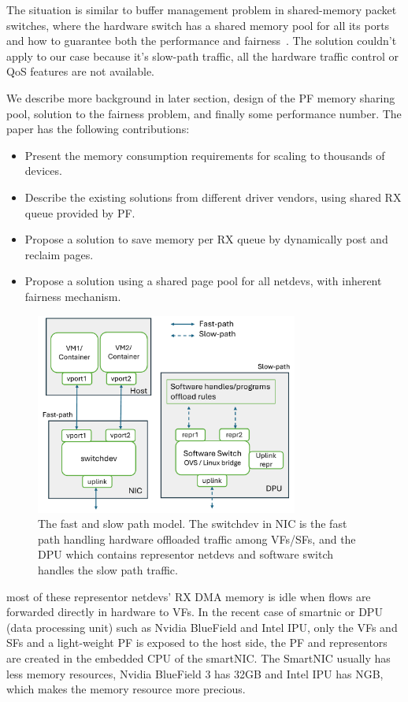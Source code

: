 \documentclass[letterpaper]{article}
\begin{document}
The situation is similar to buffer management problem in shared-memory
packet switches, where the hardware switch has a shared memory pool
for all its ports and how to guarantee both the performance and
fairness~\cite{devlinksb, queuelength}. The solution couldn't apply to
our case because it's slow-path traffic, all the hardware traffic
control or QoS features are not available.

We describe more background in later section, design of the PF memory
sharing pool, solution to the fairness problem, and finally some performance
number. The paper has the following contributions:
\begin{itemize}
    \item Present the memory consumption requirements for scaling to
          thousands of devices.
    \item Describe the existing solutions from different driver vendors,
          using shared RX queue provided by PF.
    \item Propose a solution to save memory per RX queue by dynamically
          post and reclaim pages.
    \item Propose a solution using a shared page pool for all netdevs,
          with inherent fairness mechanism.
\end{itemize}

\begin{figure}[h]
\includegraphics[width=3.4in]{arch.pdf}
\caption{The fast and slow path model. The switchdev in NIC is the fast path handling
hardware offloaded traffic among VFs/SFs, and the DPU which contains representor netdevs and software switch handles the slow path traffic.}
\label{fig:arch}
\end{figure}

\iffalse
most of these representor netdevs' RX DMA memory
is idle when flows are forwarded directly in hardware to VFs.
In the recent case of smartnic or DPU (data processing unit) such as
Nvidia BlueField and Intel IPU, only the VFs and SFs and a light-weight PF
is exposed to the host side, the PF and representors are created in the
embedded CPU of the smartNIC.
The SmartNIC usually has less memory resources, Nvidia BlueField 3 has
32GB and Intel IPU has NGB, which makes the memory resource more precious.
\end{document}
